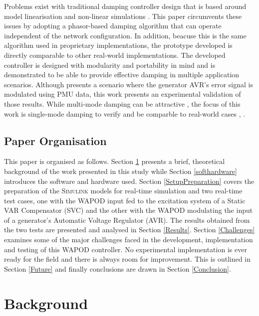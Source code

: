\documentclass[journal]{IEEEtran}
\begin{document}
Problems exist with traditional damping controller design that is based around model linearisation and non-linear simulations \cite{WAPODChina}. This paper circumvents these issues by adopting a phasor-based damping algorithm \cite{PhasorPOD} that can operate independent of the network configuration. In addition, beacuse this is the same algorithm used in proprietary implementations\cite{WAPODNorway}, the prototype developed is directly comparable to other real-world implementations. The developed controller is designed with modularity and portability in mind and is demonstrated to be able to provide effective damping in multiple application scenarios. Although \cite{Yuwa} presents a scenario where the generator AVR\rq{s} error signal is modulated using PMU data, this work presents an experimental validation of those results. While multi-mode damping can be attractive \cite{Kamwa}, the focus of this work is  single-mode damping to verify and be comparble to real-world cases \cite{WAPODNorway}, \cite{WAPODChina} .

\subsection{Paper Organisation}

This paper is organised as follows. Section \ref{Background} presents a brief, theoretical background of the work presented in this study while Section \ref{softhardware} introduces the software and hardware used. Section \ref{SetupPreparation} covers the preparation of the \textsc{Simulink} models for real-time simulation and two real-time test cases, one with the WAPOD input fed to the excitation system of a Static VAR Compensator (SVC) and the other with the WAPOD modulating the input of a generator\rq{s} Automatic Voltage Regulator (AVR). The results obtained from the two tests are presented and analysed in Section \ref{Results}. Section \ref{Challenges} examines some of the major challenges faced in the development, implementation and testing of this WAPOD controller. No experimental implementation is ever ready for the field and there is always room for improvement. This is outlined in Section \ref{Future} and finally conclusions are drawn in Section \ref{Conclusion}.
\section{Background}\label{Background}
\end{document}

